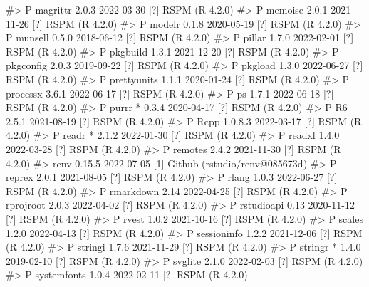 \documentclass[
  11pt,
  letterpaper,
  DIV=11,
  numbers=noendperiod]{scrartcl}
\newenvironment{Shaded}{}{}
\newcommand{\CommentTok}[1]{\textcolor[rgb]{0.42,0.45,0.49}{#1}}
\begin{document}
\begin{Shaded}
\begin{Highlighting}[]
\CommentTok{\#\textgreater{}  P magrittr      2.0.3   2022{-}03{-}30 [?] RSPM (R 4.2.0)}
\CommentTok{\#\textgreater{}  P memoise       2.0.1   2021{-}11{-}26 [?] RSPM (R 4.2.0)}
\CommentTok{\#\textgreater{}  P modelr        0.1.8   2020{-}05{-}19 [?] RSPM (R 4.2.0)}
\CommentTok{\#\textgreater{}  P munsell       0.5.0   2018{-}06{-}12 [?] RSPM (R 4.2.0)}
\CommentTok{\#\textgreater{}  P pillar        1.7.0   2022{-}02{-}01 [?] RSPM (R 4.2.0)}
\CommentTok{\#\textgreater{}  P pkgbuild      1.3.1   2021{-}12{-}20 [?] RSPM (R 4.2.0)}
\CommentTok{\#\textgreater{}  P pkgconfig     2.0.3   2019{-}09{-}22 [?] RSPM (R 4.2.0)}
\CommentTok{\#\textgreater{}  P pkgload       1.3.0   2022{-}06{-}27 [?] RSPM (R 4.2.0)}
\CommentTok{\#\textgreater{}  P prettyunits   1.1.1   2020{-}01{-}24 [?] RSPM (R 4.2.0)}
\CommentTok{\#\textgreater{}  P processx      3.6.1   2022{-}06{-}17 [?] RSPM (R 4.2.0)}
\CommentTok{\#\textgreater{}  P ps            1.7.1   2022{-}06{-}18 [?] RSPM (R 4.2.0)}
\CommentTok{\#\textgreater{}  P purrr       * 0.3.4   2020{-}04{-}17 [?] RSPM (R 4.2.0)}
\CommentTok{\#\textgreater{}  P R6            2.5.1   2021{-}08{-}19 [?] RSPM (R 4.2.0)}
\CommentTok{\#\textgreater{}  P Rcpp          1.0.8.3 2022{-}03{-}17 [?] RSPM (R 4.2.0)}
\CommentTok{\#\textgreater{}  P readr       * 2.1.2   2022{-}01{-}30 [?] RSPM (R 4.2.0)}
\CommentTok{\#\textgreater{}  P readxl        1.4.0   2022{-}03{-}28 [?] RSPM (R 4.2.0)}
\CommentTok{\#\textgreater{}  P remotes       2.4.2   2021{-}11{-}30 [?] RSPM (R 4.2.0)}
\CommentTok{\#\textgreater{}    renv          0.15.5  2022{-}07{-}05 [1] Github (rstudio/renv@085673d)}
\CommentTok{\#\textgreater{}  P reprex        2.0.1   2021{-}08{-}05 [?] RSPM (R 4.2.0)}
\CommentTok{\#\textgreater{}  P rlang         1.0.3   2022{-}06{-}27 [?] RSPM (R 4.2.0)}
\CommentTok{\#\textgreater{}  P rmarkdown     2.14    2022{-}04{-}25 [?] RSPM (R 4.2.0)}
\CommentTok{\#\textgreater{}  P rprojroot     2.0.3   2022{-}04{-}02 [?] RSPM (R 4.2.0)}
\CommentTok{\#\textgreater{}  P rstudioapi    0.13    2020{-}11{-}12 [?] RSPM (R 4.2.0)}
\CommentTok{\#\textgreater{}  P rvest         1.0.2   2021{-}10{-}16 [?] RSPM (R 4.2.0)}
\CommentTok{\#\textgreater{}  P scales        1.2.0   2022{-}04{-}13 [?] RSPM (R 4.2.0)}
\CommentTok{\#\textgreater{}  P sessioninfo   1.2.2   2021{-}12{-}06 [?] RSPM (R 4.2.0)}
\CommentTok{\#\textgreater{}  P stringi       1.7.6   2021{-}11{-}29 [?] RSPM (R 4.2.0)}
\CommentTok{\#\textgreater{}  P stringr     * 1.4.0   2019{-}02{-}10 [?] RSPM (R 4.2.0)}
\CommentTok{\#\textgreater{}  P svglite       2.1.0   2022{-}02{-}03 [?] RSPM (R 4.2.0)}
\CommentTok{\#\textgreater{}  P systemfonts   1.0.4   2022{-}02{-}11 [?] RSPM (R 4.2.0)}

\end{Highlighting}
\end{Shaded}
\end{document}

